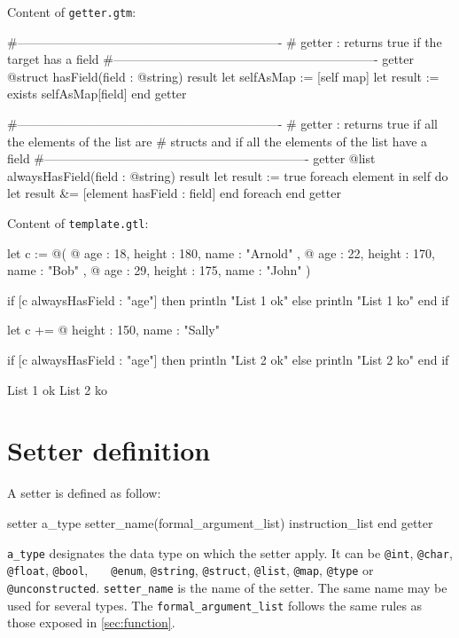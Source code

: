 \documentclass[10pt,openright,twosides,final]{memoir}
\newcommand{\gtlinline}[1]{\colorbox{light-blue}{\lstinline[language=gtl]{#1}}}
\begin{document}
\noindent Content of \texttt{\footnotesize getter.gtm}:
\begin{gtl}
#----------------------------------------------------------------
# getter : returns true if the target has a field
#----------------------------------------------------------------
getter @struct hasField(field : @string) result
  let selfAsMap := [self map]
  let result := exists selfAsMap[field]
end getter


#----------------------------------------------------------------
# getter : returns true if all the elements of the list are
# structs and if all the elements of the list have a field
#----------------------------------------------------------------
getter @list alwaysHasField(field : @string) result
  let result := true
  foreach element in self do
    let result &= [element hasField : field]
  end foreach
end getter
\end{gtl}
\noindent Content of \texttt{\footnotesize template.gtl}:
\begin{gtl}
let c := @(
  @{ age : 18, height : 180, name : "Arnold" },
  @{ age : 22, height : 170, name : "Bob"    },
  @{ age : 29, height : 175, name : "John"   }
)

if [c alwaysHasField : "age"] then
  println "List 1 ok"
else
  println "List 1 ko"
end if

let c += @{ height : 150, name : "Sally" }

if [c alwaysHasField : "age"] then
  println "List 2 ok"
else
  println "List 2 ko"
end if
\end{gtl}
\begin{console}
List 1 ok
List 2 ko
\end{console}

\section{Setter definition}

A setter is defined as follow:

\begin{gtl}
setter a_type setter_name(formal_argument_list)
  instruction_list
end getter
\end{gtl}

\gtlinline{a_type} designates the data type on which the setter apply. It can be \gtlinline{@int},  \gtlinline{@char}, \gtlinline{@float}, \gtlinline{@bool}, \gtlinline{	@enum}, \gtlinline{@string}, \gtlinline{@struct}, \gtlinline{@list}, \gtlinline{@map}, \gtlinline{@type} or \gtlinline{@unconstructed}. \gtlinline{setter_name} is the name of the setter. The same name may be used for several types. The \gtlinline{formal_argument_list} follows the same rules as those exposed in \ref{sec:function}.
\end{document}
